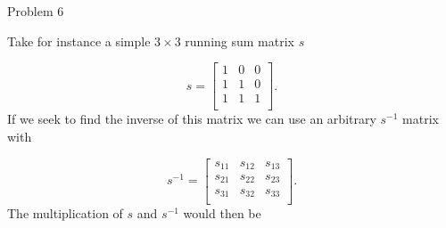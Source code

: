 \begin{problem}{Problem 6}
\begin{highlight}[Solution]
        Take for instance a simple $3 \times 3$ running sum matrix $s$

        \begin{equation}
            s = 
            \begin{bmatrix}
                1 & 0 & 0 \\
                1 & 1 & 0 \\
                1 & 1 & 1 \\
            \end{bmatrix}.
        \end{equation}
        If we seek to find the inverse of this matrix we can use an arbitrary $s^{-1}$ matrix with

        \begin{equation}
            s^{-1} =
            \begin{bmatrix}
                s_{11} & s_{12} & s_{13} \\
                s_{21} & s_{22} & s_{23} \\
                s_{31} & s_{32} & s_{33} \\
            \end{bmatrix}.
        \end{equation}
        The multiplication of $s$ and $s^{-1}$ would then be


\end{highlight}
\end{problem}
